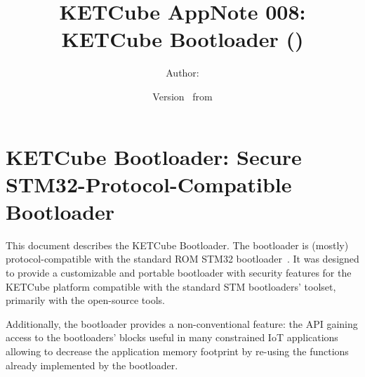   




\title{\UWBLogo KETCube AppNote 008:\\ KETCube Bootloader (\vhCurrentVersion)}

\author{Author: \vhListAllAuthorsLongWithAbbrev}
\date{Version \vhCurrentVersion\ from \vhCurrentDate}

  




  


\section*{KETCube Bootloader: Secure STM32-Protocol-Compatible Bootloader}


This document describes the KETCube Bootloader. 
The bootloader is (mostly) protocol-compatible with the standard ROM STM32 bootloader~\cite{STM32:AN3155}.
It was designed to provide a customizable and portable bootloader with security features for the KETCube platform 
compatible with the standard STM bootloaders' toolset, primarily with the open-source tools.

Additionally, the bootloader provides a non-conventional feature:
the API gaining access to the bootloaders' blocks useful in many constrained IoT applications
allowing to decrease the application memory footprint by re-using the functions already implemented by the bootloader.




